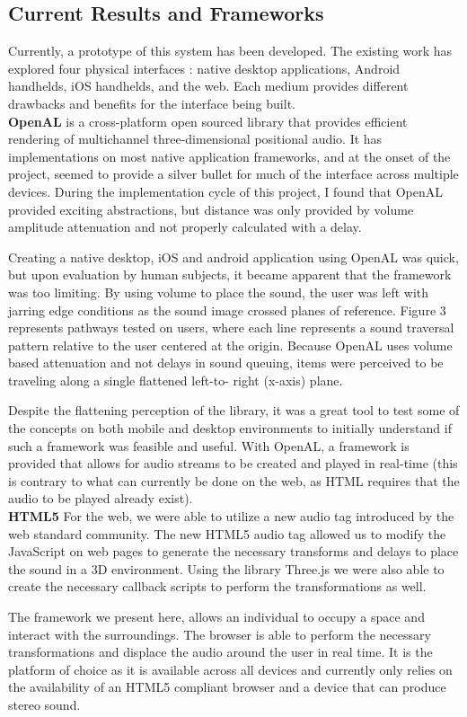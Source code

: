 \subsection{                  Current Results and Frameworks                  }

Currently, a prototype of this system has been developed.  The existing work
has explored four physical interfaces : native desktop applications, Android
handhelds, iOS handhelds, and the web. Each medium provides different drawbacks
and benefits for the interface being built.\\

\textbf{OpenAL} is a cross-platform open sourced library that provides
efficient rendering of multichannel three-dimensional positional audio.  It has
implementations on most native  application frameworks, and at the onset of the
project, seemed to provide a silver bullet for much of the interface across
multiple devices.  During the implementation cycle of this project, I found
that OpenAL provided exciting abstractions, but distance was only provided by
volume amplitude attenuation and not properly calculated with a delay.

Creating a native desktop, iOS and android application using OpenAL was quick,
but upon evaluation by  human subjects, it became apparent that the framework
was too limiting.  By using volume to place the sound, the user was left with
jarring edge conditions as the sound image crossed planes of reference.
Figure 3 represents pathways tested on users, where each line
represents a sound traversal pattern relative to the user centered at the
origin. Because OpenAL uses volume based attenuation and not delays in sound
queuing, items were perceived to be traveling along a single flattened left-to-
right (x-axis) plane.

Despite the flattening perception of the library, it was a great tool to test
some of the concepts on both mobile and desktop environments to initially
understand if such a framework was feasible and useful.  With OpenAL, a
framework is provided that allows for audio streams to be created and played in
real-time (this is contrary to what can currently be done on the web, as HTML
requires that the audio to be played already exist).\\


\textbf{HTML5} For the web, we were able to utilize a new audio tag introduced
by the web standard community.  The new HTML5 audio tag allowed us to modify the
JavaScript on web pages to generate the necessary transforms and delays to
place the sound in a 3D environment.  Using the library Three.js we were also
able to create the necessary callback scripts to perform the transformations as
well.

The framework we present here, allows an individual to occupy a space and
interact with the surroundings.  The browser is able to perform the necessary
transformations and displace the audio around the user in real time. It is the
platform of choice as it is available across all devices and currently only
relies on the availability of an HTML5 compliant browser and a device that
can produce stereo sound.
